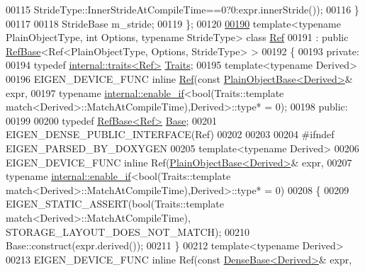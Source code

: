 \begin{DoxyCode}
00115                                    StrideType::InnerStrideAtCompileTime==0?0:expr.innerStride());    
00116   \}
00117 
00118   StrideBase m\_stride;
00119 \};
00120 
\hyperlink{group___core___module}{00190} \textcolor{keyword}{template}<\textcolor{keyword}{typename} PlainObjectType, \textcolor{keywordtype}{int} Options, \textcolor{keyword}{typename} Str\textcolor{keywordtype}{id}eType> \textcolor{keyword}{class }\hyperlink{group___core___module_class_eigen_1_1_ref}{Ref}
00191   : \textcolor{keyword}{public} \hyperlink{class_eigen_1_1_ref_base}{RefBase}<Ref<PlainObjectType, Options, StrideType> >
00192 \{
00193   \textcolor{keyword}{private}:
00194     \textcolor{keyword}{typedef} \hyperlink{struct_eigen_1_1internal_1_1traits}{internal::traits<Ref>} \hyperlink{struct_eigen_1_1internal_1_1traits}{Traits};
00195     \textcolor{keyword}{template}<\textcolor{keyword}{typename} Derived>
00196     EIGEN\_DEVICE\_FUNC \textcolor{keyword}{inline} \hyperlink{group___core___module_class_eigen_1_1_ref}{Ref}(\textcolor{keyword}{const} \hyperlink{class_eigen_1_1_plain_object_base}{PlainObjectBase<Derived>}& expr,
00197                                  \textcolor{keyword}{typename} \hyperlink{struct_eigen_1_1internal_1_1enable__if}{internal::enable\_if}<\textcolor{keywordtype}{bool}(Traits::template 
      match<Derived>::MatchAtCompileTime),Derived>::type* = 0);
00198   \textcolor{keyword}{public}:
00199 
00200     \textcolor{keyword}{typedef} \hyperlink{class_eigen_1_1_ref_base}{RefBase<Ref>} \hyperlink{class_eigen_1_1_ref_base}{Base};
00201     EIGEN\_DENSE\_PUBLIC\_INTERFACE(Ref)
00202 
00203 
00204     \textcolor{preprocessor}{#ifndef EIGEN\_PARSED\_BY\_DOXYGEN}
00205     \textcolor{keyword}{template}<\textcolor{keyword}{typename} Derived>
00206     EIGEN\_DEVICE\_FUNC \textcolor{keyword}{inline} Ref(\hyperlink{class_eigen_1_1_plain_object_base}{PlainObjectBase<Derived>}& expr,
00207                                  \textcolor{keyword}{typename} \hyperlink{struct_eigen_1_1internal_1_1enable__if}{internal::enable\_if}<\textcolor{keywordtype}{bool}(Traits::template 
      match<Derived>::MatchAtCompileTime),Derived>::type* = 0)
00208     \{
00209       EIGEN\_STATIC\_ASSERT(\textcolor{keywordtype}{bool}(Traits::template match<Derived>::MatchAtCompileTime), 
      STORAGE\_LAYOUT\_DOES\_NOT\_MATCH);
00210       Base::construct(expr.derived());
00211     \}
00212     \textcolor{keyword}{template}<\textcolor{keyword}{typename} Derived>
00213     EIGEN\_DEVICE\_FUNC \textcolor{keyword}{inline} Ref(\textcolor{keyword}{const} \hyperlink{group___core___module_class_eigen_1_1_dense_base}{DenseBase<Derived>}& expr,

\end{DoxyCode}
